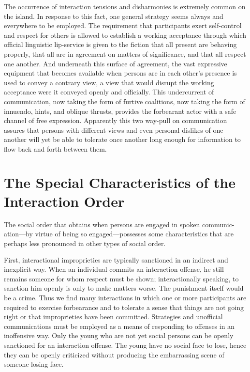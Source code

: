 \documentclass[twoside,symmetric,nobib,justified]{tufte-book}
\begin{document}
The occurrence of interaction tensions and disharmonies is extremely
common on the island. In response to this fact, one general strategy
seems always and everywhere to be employed. The requirement that
participants exert self-control and respect for others is allowed to
establish a working acceptance through which official linguistic
lip-service is given to the fiction that all present are behaving
properly, that all are in agreement on matters of significance, and that
all respect one another. And underneath this surface of agreement, the
vast expressive equipment that becomes available when persons are in
each other's presence is used to convey a contrary view, a view that
would disrupt the working acceptance were it conveyed openly and
officially. This undercurrent of communication, now taking the form of
furtive coalitions, now taking the form of innuendo, hints, and oblique
thrusts, provides the forbearant actor with a safe channel of free
expression. Apparently this two way-pull on communication assures that
persons with different views and even personal dislikes of one another
will yet be able to tolerate once another long enough for information to
flow back and forth between them.

\hypertarget{the-special-characteristics-of-the-interaction-order}{%
\section{The Special Characteristics of the\\\noindent Interaction
Order}\label{the-special-characteristics-of-the-interaction-order}}

The social order that obtains when persons are engaged in spoken
communic- ation---by virtue of being so engaged---possesses some
characteristics that are perhaps less pronounced in other types of
social order.

\enlargethispage{\baselineskip}

First, interactional improprieties are typically sanctioned in an
indirect and inexplicit way. When an individual commits an interaction
offense, he still remains someone for whom respect must be shown;
interactionally speaking, to sanction him openly is only to make matters
worse. The punishment itself would be a crime. Thus we find many
interactions in which one or more participants are required to exercise
forbearance and to tolerate a sense that things are not going right or
that improprieties have been committed. Strategies and unofficial
communications must be employed as a means of responding to offenses in
an inoffensive way. Only the young who are not yet social persons can be
openly sanctioned for an interaction offense. The young have no social
face to lose, hence they can be openly criticized without producing the
embarrassing scene of someone losing face.
\end{document}
